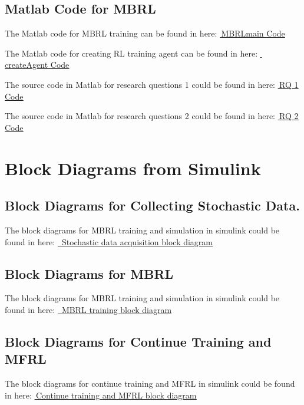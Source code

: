 \subsection*{Matlab Code for MBRL}
\label{code:mbrl}
The Matlab code for MBRL training can be found in here: \href{https://github.com/n7729697/KTH-MasterThesis/blob/main/code/MBRLmain.mlx}{\faGithub\,\underline{MBRLmain Code}}

The Matlab code for creating RL training agent can be found in here: \href{https://github.com/n7729697/KTH-MasterThesis/blob/main/code/createAgent.mlx}{\faGithub\,\underline{createAgent Code}}

The source code in Matlab for research questions 1 could be found in here: \href{https://github.com/n7729697/KTH-MasterThesis/blob/main/code/RQ1}{\faGithub\,\underline{RQ 1 Code}}

The source code in Matlab for research questions 2 could be found in here: \href{https://github.com/n7729697/KTH-MasterThesis/blob/main/code/RQ2}{\faGithub\,\underline{RQ 2 Code}}

\section{Block Diagrams from Simulink}
\subsection*{Block Diagrams for Collecting Stochastic Data.}
The block diagrams for MBRL training and simulation in simulink could be found in here: \href{https://github.com/n7729697/KTH-MasterThesis/blob/main/img/AppB/ModelRobot.pdf}{\faGithub\,\underline{ Stochastic data acquisition block diagram}}
\subsection*{Block Diagrams for MBRL}
The block diagrams for MBRL training and simulation in simulink could be found in here: \href{https://github.com/n7729697/KTH-MasterThesis/blob/main/img/AppB/RLtrot.pdf}{\faGithub\,\underline{ MBRL training block diagram}}
\subsection*{Block Diagrams for Continue Training and MFRL}
The block diagrams for continue training and MFRL in simulink could be found in here: \href{https://github.com/n7729697/KTH-MasterThesis/blob/main/img/AppB/RLvali.pdf}{\faGithub\,\underline{Continue training and MFRL block diagram}}
